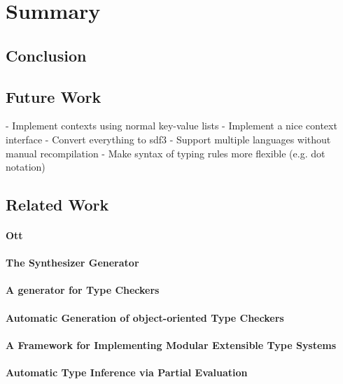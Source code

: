 \chapter{Summary}
\section{Conclusion}
\section{Future Work}
- Implement contexts using normal key-value lists
- Implement a nice context interface
- Convert everything to sdf3
- Support multiple languages without manual recompilation
- Make syntax of typing rules more flexible (e.g. dot notation)
\section{Related Work}
\subsubsection{Ott}
\subsubsection{The Synthesizer Generator}
\subsubsection{A generator for Type Checkers}
\subsubsection{Automatic Generation of object-oriented Type Checkers}
\subsubsection{A Framework for Implementing Modular Extensible Type
  Systems}
\subsubsection{Automatic Type Inference via Partial Evaluation}

